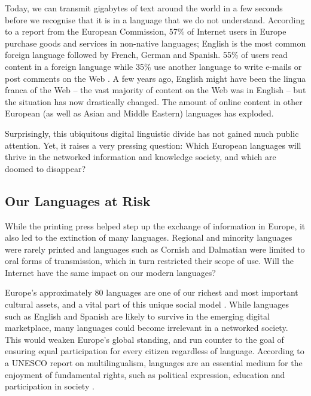 \begin{multicols}{2}
Today, we can transmit gigabytes of text around the world in a few seconds before we recognise that it is in a language that we do not understand. According to a report from the European Commission, 57\% of Internet users in Europe purchase goods and services in non-native languages; English is the most common foreign language followed by French, German and Spanish. 55\% of users read content in a foreign language while 35\% use another language to write e-mails or post comments on the Web \cite{EC1}. A few years ago, English might have been the lingua franca of the Web -- the vast majority of content on the Web was in English -- but the situation has now drastically changed. The amount of online content in other European (as well as Asian and Middle Eastern) languages has exploded.

Surprisingly, this ubiquitous digital linguistic divide has not gained much public attention. Yet, it raises a very pressing question: Which European languages will thrive in the networked information and knowledge society, and which are doomed to disappear?


\subsection{Our Languages at Risk}

While the printing press helped step up the exchange of information in Europe, it also led to the extinction of many languages. Regional and minority languages were rarely printed and languages such as Cornish and Dalmatian were limited to oral forms of transmission, which in turn restricted their scope of use. Will the Internet have the same impact on our modern languages?


Europe’s approximately 80 languages are one of our richest and most important cultural assets, and a vital part of this unique social model \cite{EC2}. While languages such as English and Spanish are likely to survive in the emerging digital marketplace, many languages could become irrelevant in a networked society. This would weaken Europe’s global standing, and run counter to the goal of ensuring equal participation for every citizen regardless of language. According to a UNESCO report on multilingualism, languages are an essential medium for the enjoyment of fundamental rights, such as political expression, education and participation in society \cite{Unesco1}.


\end{multicols}
